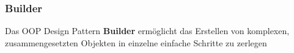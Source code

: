 \subsubsection{Builder}

Das OOP Design Pattern \textbf{Builder} ermöglicht das Erstellen von komplexen, zusammengesetzten Objekten in einzelne einfache Schritte zu zerlegen